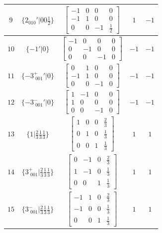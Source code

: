 \documentclass[fleqn,8pt]{jsarticle}
\begin{document}
\begin{longtable}{ccccc}
$ 9 $ & $ \{2{}_{010}{}'|0 0 \frac{1}{2}\} $ & $ \begin{bmatrix} -1 & 0 & 0 & 0 \\ -1 & 1 & 0 & 0 \\ 0 & 0 & -1 & \frac{1}{2} \end{bmatrix} $ & $ 1 $ & $ -1 $ \\ \hline
$ 10 $ & $ \{-1{}'|0\} $ & $ \begin{bmatrix} -1 & 0 & 0 & 0 \\ 0 & -1 & 0 & 0 \\ 0 & 0 & -1 & 0 \end{bmatrix} $ & $ -1 $ & $ -1 $ \\ \hline
$ 11 $ & $ \{-3^{+}_{\,\,001}{}'|0\} $ & $ \begin{bmatrix} 0 & 1 & 0 & 0 \\ -1 & 1 & 0 & 0 \\ 0 & 0 & -1 & 0 \end{bmatrix} $ & $ -1 $ & $ -1 $ \\ \hline
$ 12 $ & $ \{-3^{-}_{\,\,001}{}'|0\} $ & $ \begin{bmatrix} 1 & -1 & 0 & 0 \\ 1 & 0 & 0 & 0 \\ 0 & 0 & -1 & 0 \end{bmatrix} $ & $ -1 $ & $ -1 $ \\ \hline
$ 13 $ & $ \{1|\frac{2}{3} \frac{1}{3} \frac{1}{3}\} $ & $ \begin{bmatrix} 1 & 0 & 0 & \frac{2}{3} \\ 0 & 1 & 0 & \frac{1}{3} \\ 0 & 0 & 1 & \frac{1}{3} \end{bmatrix} $ & $ 1 $ & $ 1 $ \\ \hline
$ 14 $ & $ \{3^{+}_{\,\,001}|\frac{2}{3} \frac{1}{3} \frac{1}{3}\} $ & $ \begin{bmatrix} 0 & -1 & 0 & \frac{2}{3} \\ 1 & -1 & 0 & \frac{1}{3} \\ 0 & 0 & 1 & \frac{1}{3} \end{bmatrix} $ & $ 1 $ & $ 1 $ \\ \hline
$ 15 $ & $ \{3^{-}_{\,\,001}|\frac{2}{3} \frac{1}{3} \frac{1}{3}\} $ & $ \begin{bmatrix} -1 & 1 & 0 & \frac{2}{3} \\ -1 & 0 & 0 & \frac{1}{3} \\ 0 & 0 & 1 & \frac{1}{3} \end{bmatrix} $ & $ 1 $ & $ 1 $ \\ \hline

\end{longtable}
\end{document}
